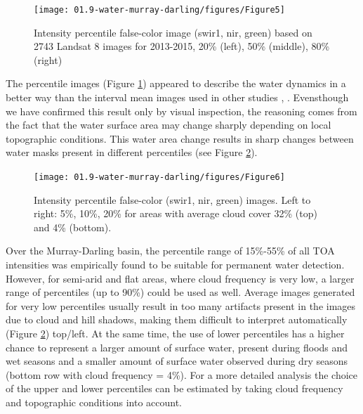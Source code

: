 \begin{figure}
	\centering
	\texttt{[image: 01.9-water-murray-darling/figures/Figure5]}
	\caption{Intensity percentile false-color image (swir1, nir, green) based on 2743 Landsat 8 images for 2013-2015, 20\% (left), 50\% (middle), 80\% (right)}
	\label{fig:au-percentiles}
\end{figure}

The percentile images (Figure \ref{fig:au-percentiles}) appeared to describe the water dynamics in a better way than the interval mean images used in other studies \citet{Potapov2012}, \citet{Hansen2013}. Evensthough we have confirmed this result only by visual inspection, the reasoning comes from the fact that the water surface area may change sharply depending on local topographic conditions. This water area change results in sharp changes between water masks present in different percentiles (see Figure \ref{fig:au-percentiles-clouds}). 

\begin{figure}
	\centering
	\texttt{[image: 01.9-water-murray-darling/figures/Figure6]}
	\caption{Intensity percentile false-color (swir1, nir, green) images. Left to right: 5\%, 10\%, 20\% for areas with average cloud cover 32\% (top) and 4\% (bottom). }
	\label{fig:au-percentiles-clouds}
\end{figure}

Over the Murray-Darling basin, the percentile range of 15\%-55\% of all TOA intensities was empirically found to be suitable for permanent water detection. However, for semi-arid and flat areas, where cloud frequency is very low, a larger range of percentiles (up to 90\%) could be used as well. Average images generated for very low percentiles usually result in too many artifacts present in the images due to cloud and hill shadows, making them difficult to interpret automatically (Figure \ref{fig:au-percentiles-clouds}) top/left. At the same time, the use of lower percentiles has a higher chance to represent a larger amount of surface water, present during floods and wet seasons and a smaller amount of surface water observed during dry seasons (bottom row with cloud frequency = 4\%). For a more detailed analysis the choice of the upper and lower percentiles can be estimated by taking cloud frequency and topographic conditions into account.

